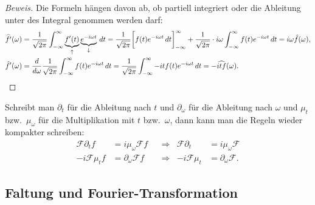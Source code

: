 \begin{proof}[Beweis]
Die Formeln hängen davon ab, ob partiell integriert oder die Ableitung
unter des Integral genommen werden darf:
\begin{align*}
\widehat{f'}(\omega)
&=
\frac{1}{\sqrt{2\pi}}
\int_{-\infty}^\infty \underbrace{f'(t)}_{\uparrow}\underbrace{e^{-i\omega t}}_{\downarrow}\,dt
=
\frac{1}{\sqrt{2\pi}}
\biggl[
f(t)e^{-i\omega t}\,dt
\biggr]_{-\infty}^\infty
+
\frac{1}{\sqrt{2\pi}}
\cdot
i\omega
\int_{-\infty}^\infty f(t)e^{-i\omega t}\,dt
=
i\omega\hat{f}(\omega),
\\
\hat{f}'(\omega)
&=
\frac{d}{d\omega}
\frac{1}{\sqrt{2\pi}} \int_{-\infty}^\infty
f(t) e^{-i\omega t}\,dt
=
\frac{1}{\sqrt{2\pi}} \int_{-\infty}^\infty
-it f(t) e^{-i\omega t}\,dt
=
-\widehat{itf}(\omega).
\qedhere
\end{align*}
\end{proof}

Schreibt man $\partial_t$ für die Ableitung nach $t$ und $\partial_\omega$
für die Ableitung nach $\omega$ und $\mu_{t}$ bzw.~$\mu_{\omega}$ für
die Multiplikation mit $t$ bzw.~$\omega$, dann kann man die Regeln wieder
kompakter schreiben:
\[
\begin{aligned}
\mathcal{F}\partial_t f &= i\mu_{\omega}\mathcal{F}f
&&\Rightarrow&
\mathcal{F}\partial_t &= i\mu_{\omega}\mathcal{F}
\\
-i\mathcal{F}\mu_t f &= \partial_\omega\mathcal{F} f
&&\Rightarrow&
-i\mathcal{F}\mu_t &= \partial_\omega\mathcal{F}.
\end{aligned}
\]

\subsection{Faltung und Fourier-Transformation
\label{subsection:faltung-und-ft}}

